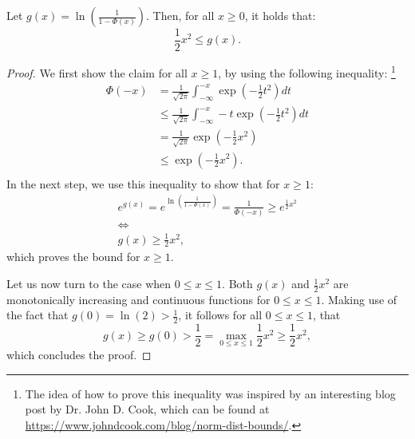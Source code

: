 \begin{lemma}
    \label{lemma:lower-bound}
    Let $g(x) = \ln \left( \frac{1}{1 - \Phi(x)}\right)$.
    Then, for all $x \geq 0$, it holds that:
    \begin{equation*}
        \frac{1}{2} x^2 \leq g(x).
    \end{equation*}
\end{lemma}
\begin{proof}
    We first show the claim for all $x \geq 1$, by using the following
    inequality:
    \footnote{The idea of how to prove this inequality was inspired
        by an interesting blog post by
        Dr. John D. Cook, which can be found at
        \url{https://www.johndcook.com/blog/norm-dist-bounds/}.}
    \begin{align*}
        \Phi(-x) & = \frac{1}{\sqrt{2 \pi}} \int_{-\infty}^{-x} \exp{ \left(-\frac{1}{2} t^2 \right)} dt       \\
                 & \leq \frac{1}{\sqrt{2 \pi}} \int_{-\infty}^{-x} -t \exp{ \left(-\frac{1}{2} t^2 \right)} dt \\
                 & = \frac{1}{\sqrt{2 \pi}} \exp{\left( -\frac{1}{2} x^2 \right)}                              \\
                 & \leq \exp{\left( -\frac{1}{2} x^2 \right)}.                                                 \\
    \end{align*}
    In the next step, we use this inequality to show that for $x \geq 1$:
    \begin{gather*}
        e^{g(x)} = e^{\ln \left( \frac{1}{1 - \Phi(x)} \right)} = \frac{1}{\Phi(-x)} \geq e^{\frac{1}{2} x^2}\\
        \iff \\
        g(x) \geq \frac{1}{2} x^2,
    \end{gather*}
    which proves the bound for $x \geq 1$.

    Let us now turn to the case when $0 \leq x \leq 1$.
    Both $g(x)$ and $\frac{1}{2}x^2$ are monotonically increasing
    and continuous functions for $0 \leq x \leq 1$.
    Making use of the fact that $g(0) = \ln(2) > \frac{1}{2}$, it follows
    for all $0 \leq x \leq 1$, that
    \begin{equation*}
        g(x) \geq g(0) > \frac{1}{2} = \max_{0 \leq x \leq 1} \frac{1}{2} x^2 \geq \frac{1}{2} x^2,
    \end{equation*}
    which concludes the proof.
\end{proof}

